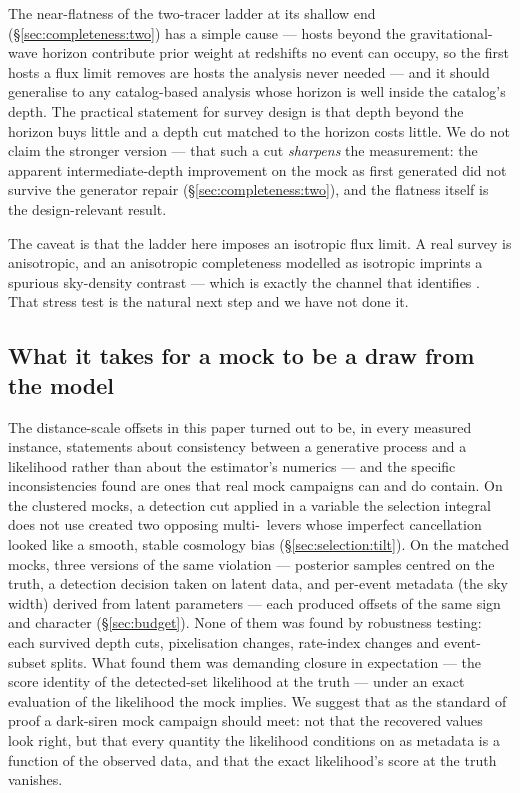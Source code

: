 The near-flatness of the two-tracer ladder at its shallow end
(\S\ref{sec:completeness:two}) has a simple cause --- hosts beyond the
gravitational-wave horizon contribute prior weight at redshifts no event can
occupy, so the first hosts a flux limit removes are hosts the analysis never
needed --- and it should generalise to any catalog-based analysis whose
horizon is well inside the catalog's depth. The practical statement for
survey design is that depth beyond the horizon buys little and a depth cut
matched to the horizon costs little. We do not claim the stronger version ---
that such a cut \emph{sharpens} the measurement: the apparent
intermediate-depth improvement on the mock as first generated did not survive
the generator repair (\S\ref{sec:completeness:two}), and the flatness itself
is the design-relevant result.

The caveat is that the ladder here imposes an isotropic flux limit. A real survey
is anisotropic, and an anisotropic completeness modelled as isotropic imprints a
spurious sky-density contrast --- which is exactly the channel that identifies
\fagn. That stress test is the natural next step and we have not done it.

\subsection{What it takes for a mock to be a draw from the model}
\label{sec:disc:residual}

The distance-scale offsets in this paper turned out to be, in every measured
instance, statements about consistency between a generative process and a
likelihood rather than about the estimator's numerics --- and the specific
inconsistencies found are ones that real mock campaigns can and do contain.
On the clustered mocks, a detection cut applied in a variable the selection
integral does not use created two opposing multi-\kmsmpc\ levers whose
imperfect cancellation looked like a smooth, stable cosmology bias
(\S\ref{sec:selection:tilt}). On the matched mocks, three versions of the
same violation --- posterior samples centred on the truth, a detection
decision taken on latent data, and per-event metadata (the sky width) derived
from latent parameters --- each produced offsets of the same sign and
character (\S\ref{sec:budget}). None of them was found by robustness
testing: each survived depth cuts, pixelisation changes, rate-index changes
and event-subset splits. What found them was demanding closure in
expectation --- the score identity of the detected-set likelihood at the
truth --- under an exact evaluation of the likelihood the mock implies. We
suggest that as the standard of proof a dark-siren mock campaign should meet:
not that the recovered values look right, but that every quantity the
likelihood conditions on as metadata is a function of the observed data, and
that the exact likelihood's score at the truth vanishes.

